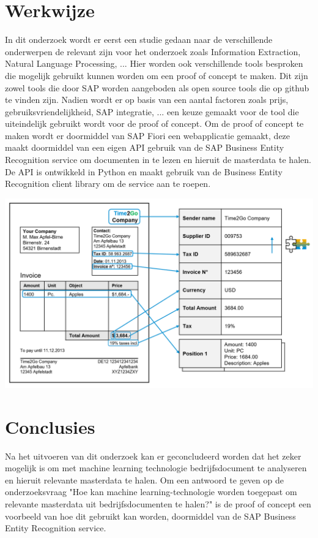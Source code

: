 \documentclass[a0,portrait]{hogent-poster}
\begin{document}
\begin{multicols}{2}
\section{Werkwijze}
In dit onderzoek wordt er eerst een studie gedaan naar de verschillende onderwerpen de relevant zijn voor het onderzoek zoals Information Extraction, Natural Language Processing, ... Hier worden ook verschillende tools besproken die mogelijk gebruikt kunnen worden om een proof of concept te maken. Dit zijn zowel tools die door SAP worden aangeboden als open source tools die op github te vinden zijn. 
Nadien wordt er op basis van een aantal factoren zoals prijs, gebruiksvriendelijkheid, SAP integratie, ... een keuze gemaakt voor de tool die uiteindelijk gebruikt wordt voor de proof of concept. Om de proof of concept te maken wordt er doormiddel van SAP Fiori een webapplicatie gemaakt, deze maakt doormiddel van een eigen API gebruik van de SAP Business Entity Recognition service om documenten in te lezen en hieruit de masterdata te halen. De API is ontwikkeld in Python en maakt gebruik van de Business Entity Recognition client library om de service aan te roepen.
\begin{center}
  \captionsetup{type=figure}
  \includegraphics[width=1.0\linewidth]{./graphics/information_extraction.png}
\end{center}

\section{Conclusies}

Na het uitvoeren van dit onderzoek kan er geconcludeerd worden dat het zeker mogelijk is om met machine learning technologie bedrijfsdocument te analyseren en hieruit relevante masterdata te halen. Om een antwoord te geven op de onderzoeksvraag "Hoe kan machine learning-technologie worden toegepast om relevante masterdata uit bedrijfsdocumenten te halen?" is de proof of concept een voorbeeld van hoe dit gebruikt kan worden, doormiddel van de SAP Business Entity Recognition service.


\end{multicols}
\end{document}
